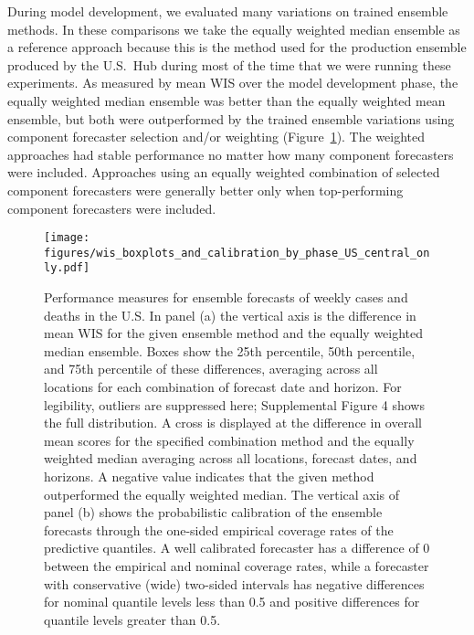 \documentclass[11pt,3p,review,authoryear]{elsarticle}
\begin{document}
During model development, we evaluated many variations on trained ensemble methods. In these comparisons we take the equally weighted median ensemble as a reference approach because this is the method used for the production ensemble produced by the U.S.\ Hub during most of the time that we were running these experiments. As measured by mean WIS over the model development phase, the equally weighted median ensemble was better than the equally weighted mean ensemble, but both were outperformed by the trained ensemble variations using component forecaster selection and/or weighting (Figure~\ref{fig:wis_boxplots_and_calibration_by_phase_US_central_only}). The weighted approaches had stable performance no matter how many component forecasters were included. Approaches using an equally weighted combination of selected component forecasters were generally better only when top-performing component forecasters were included.

\begin{figure}
\texttt{[image: figures/wis\_boxplots\_and\_calibration\_by\_phase\_US\_central\_only.pdf]}
\caption{Performance measures for ensemble forecasts of weekly cases and deaths in the U.S. In panel (a) the vertical axis is the difference in mean WIS for the given ensemble method and the equally weighted median ensemble.
Boxes show the 25th percentile, 50th percentile, and 75th percentile of these differences, averaging across all locations for each combination of forecast date and horizon.
For legibility, outliers are suppressed here; Supplemental Figure 4 shows the full distribution.
A cross is displayed at the difference in overall mean scores for the specified combination method and the equally weighted median averaging across all locations, forecast dates, and horizons.
A negative value indicates that the given method outperformed the equally weighted median.
The vertical axis of panel (b) shows the probabilistic calibration of the ensemble forecasts through the one-sided empirical coverage rates of the predictive quantiles.
A well calibrated forecaster has a difference of 0 between the empirical and nominal coverage rates, while a forecaster with conservative (wide) two-sided intervals has negative differences for nominal quantile levels less than 0.5 and positive differences for quantile levels greater than 0.5.
}
\label{fig:wis_boxplots_and_calibration_by_phase_US_central_only}
\end{figure}
\end{document}
